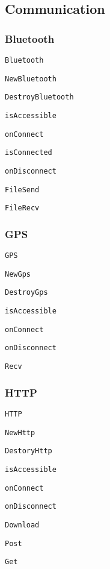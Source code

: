 \subsection*{Communication}

\subsubsection*{Bluetooth}


\begin{DoxyItemize}
\item {\tt Bluetooth}
\begin{DoxyItemize}
\item {\tt New\-Bluetooth}
\item {\tt Destroy\-Bluetooth}
\item {\tt is\-Accessible}
\item {\tt on\-Connect}
\item {\tt is\-Connected}
\item {\tt on\-Disconnect}
\item {\tt File\-Send}
\item {\tt File\-Recv}
\end{DoxyItemize}
\end{DoxyItemize}

\subsubsection*{G\-P\-S}


\begin{DoxyItemize}
\item {\tt G\-P\-S}
\begin{DoxyItemize}
\item {\tt New\-Gps}
\item {\tt Destroy\-Gps}
\item {\tt is\-Accessible}
\item {\tt on\-Connect}
\item {\tt on\-Disconnect}
\item {\tt Recv}
\end{DoxyItemize}
\end{DoxyItemize}

\subsubsection*{H\-T\-T\-P}


\begin{DoxyItemize}
\item {\tt H\-T\-T\-P}
\begin{DoxyItemize}
\item {\tt New\-Http}
\item {\tt Destory\-Http}
\item {\tt is\-Accessible}
\item {\tt on\-Connect}
\item {\tt on\-Disconnect}
\item {\tt Download}
\item {\tt Post}
\item {\tt Get}
\end{DoxyItemize}
\end{DoxyItemize}

